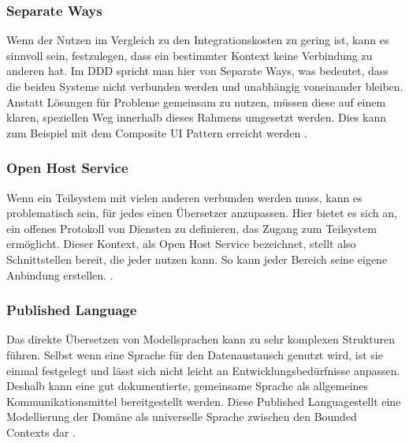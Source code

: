 {\subsubsection{Separate Ways}

Wenn der Nutzen im Vergleich zu den Integrationskosten zu gering ist, kann es sinnvoll sein, festzulegen, dass ein bestimmter Kontext keine Verbindung zu anderen hat. Im DDD spricht man hier von \glqq Separate Ways\grqq{}, was bedeutet, dass die beiden Systeme nicht verbunden werden und unabhängig voneinander bleiben. Anstatt Lösungen für Probleme gemeinsam zu nutzen, müssen diese auf einem klaren, speziellen Weg innerhalb dieses Rahmens umgesetzt werden. Dies kann zum Beispiel mit dem Composite UI Pattern erreicht werden \cite[S. 371 - 373]{evans} \cite[S. 47]{wolff} \cite[S.66]{dowalil}.


\subsubsection{Open Host Service}

Wenn ein Teilsystem mit vielen anderen verbunden werden muss, kann es problematisch sein, für jedes einen Übersetzer anzupassen. Hier bietet es sich an, ein offenes Protokoll von Diensten zu definieren, das Zugang zum Teilsystem ermöglicht. Dieser Kontext, als \glqq Open Host Service\grqq{} bezeichnet, stellt also Schnittstellen bereit, die jeder nutzen kann. So kann jeder Bereich seine eigene Anbindung erstellen.
\cite[S. 374]{evans} \cite[S. 48]{wolff} \cite[S.66]{dowalil}.

\subsubsection{Published Language}

Das direkte Übersetzen von Modellsprachen kann zu sehr komplexen Strukturen führen. Selbst wenn eine Sprache für den Datenaustausch genutzt wird, ist sie einmal festgelegt und lässt sich nicht leicht an Entwicklungsbedürfnisse anpassen. Deshalb kann eine gut dokumentierte, gemeinsame Sprache als allgemeines Kommunikationsmittel bereitgestellt werden. Diese \glqq Published Language\grqq stellt eine Modellierung der Domäne als universelle Sprache zwischen den Bounded Contexts dar \cite[S. 375-378]{evans} \cite[S. 48]{wolff} \cite[s.65]{dowalil}.

%
%

}
